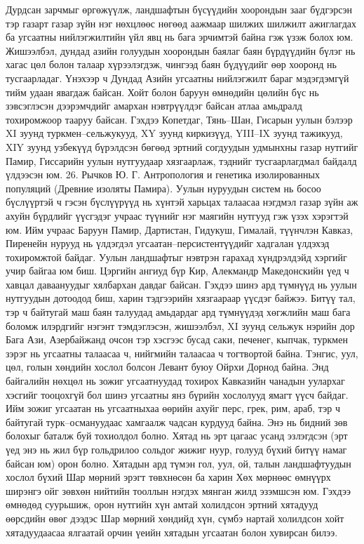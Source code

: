 Дурдсан зарчмыг өргөжүүлж, ландшафтын бүсүүдийн хоорондын зааг бүдгэрсэн тэр газарт газар зүйн нэг нөхцлөөс нөгөөд аажмаар шилжих шилжилт ажиглагдах ба угсаатны нийлэгжилтийн үйл явц нь бага эрчимтэй байна гэж үзэж болох юм. Жишээлбэл, дундад азийн голуудын хоорондын баялаг баян бүрдүүдийн бүлэг нь хагас цөл болон талаар хүрээлэгдэж, чингээд баян бүдүүдийг өөр хооронд нь тусгаарладаг. Үнэхээр ч Дундад Азийн угсаатны нийлэгжилт бараг мэдэгдэмгүй тийм удаан явагдаж байсан. Хойт болон баруун өмнөдийн цөлийн бүс нь зэвсэглэсэн дээрэмчдийг амархан нэвтрүүлдэг байсан атлаа амьдралд тохиромжоор тааруу байсан. Гэхдээ Копетдаг, Тянь–Шан, Гисарын уулын бэлээр XI зуунд туркмен–сельжукууд, XY зуунд киркизүүд, YIII–IX зуунд тажикууд, XIY зуунд узбекүүд бүрэлдсэн бөгөөд эртний согдуудын удмынхны газар нутгийг Памир, Гиссарийн уулын нутгуудаар хязгаарлаж, тэднийг тусгаарлагдмал байдалд үлдээсэн юм. 26. Рычков Ю. Г. Антропология и генетика изолированных популяций (Древние изоляты Памира).
Уулын нуруудын систем нь босоо бүслүүртэй ч гэсэн бүслүүрүүд нь хүнтэй харьцах талаасаа нэгдмэл газар зүйн аж ахуйн бүрдлийг үүсгэдэг учраас түүнийг нэг маягийн нутгууд гэж үзэх хэрэгтэй юм. Ийм учраас Баруун Памир, Дартистан, Гидукуш, Гималай, түүнчлэн Кавказ, Пиренейн нурууд нь үлдэгдэл угсаатан–персистентүүдийг хадгалан үлдэхэд тохиромжтой байдаг. Уулын ландшафтыг нэвтрэн гарахад хүндрэлдэйд хэргийг учир байгаа юм биш. Цэргийн ангиуд бүр Кир, Алекмандр Македонскийн үед ч хавцал даваануудыг хялбархан давдаг байсан. Гэхдээ шинэ ард түмнүүд нь уулын нутгуудын дотоодод биш, харин тэдгээрийн хязгаараар үүсдэг байжээ.
Битүү тал, тэр ч байтугай маш баян талуудад амьдардаг ард түмнүүдэд хөгжлийн маш бага боломж илэрдгийг нэгэнт тэмдэглэсэн, жишээлбэл, XI зуунд сельжук нэрийн дор Бага Ази, Азербайжанд очсон тэр хэсгээс бусад саки, печенег, кыпчак, туркмен зэрэг нь угсаатны талаасаа ч, нийгмийн талаасаа ч тогтвортой байна.
Тэнгис, уул, цөл, голын хөндийн хослол болсон Левант буюу Ойрхи Дорнод байна. Энд байгалийн нөхцөл нь зожиг угсаатнуудад тохирох Кавказийн чанадын уулархаг хэсгийг тооцохгүй бол шинэ угсаатны янз бүрийн хослолууд ямагт үүсч байдаг. Ийм зожиг угсаатан нь угсаатныхаа өөрийн ахуйг перс, грек, рим, араб, тэр ч байтугай турк–османуудаас хамгаалж чадсан курдууд байна. Энэ нь бидний зөв болохыг баталж буй тохиолдол болно.
Хятад нь эрт цагаас усанд эзлэгдсэн (эрт үед энэ нь жил бүр гольдрилоо сольдог жижиг нуур, голууд бүхий битүү намаг байсан юм) орон болно. Хятадын ард түмэн гол, уул, ой, талын ландшафтуудын хослол бүхий Шар мөрний эрэгт төвхнөсөн ба харин Хөх мөрнөөс өмнүүрх ширэнгэ ойг зөвхөн нийтийн тооллын нэгдэх мянган жилд эзэмшсэн юм. Гэхдээ өмнөдөд суурьшиж, орон нутгийн хүн амтай холилдсон эртний хятадууд өөрсдийн өвөг дээдэс Шар мөрний хөндийд хүн, сүмбэ нартай холилдсон хойт хятадуудаасаа ялгаатай орчин үеийн хятадын угсаатан болон хувирсан билээ.

